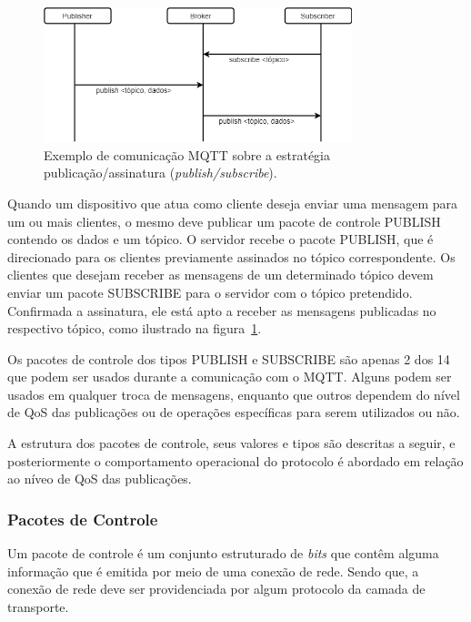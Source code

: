 \begin{figure}[ht]
	\centering
	\includegraphics[width=0.8\textwidth]{imagens/mqtt_broker.png}
	\caption{Exemplo de comunicação MQTT sobre a estratégia publicação/assinatura (\textit{publish/subscribe}).
		\label{fig:mqtt_broker}}
\end{figure}
\FloatBarrier

Quando um dispositivo que atua como cliente deseja enviar uma mensagem para um ou mais clientes, o mesmo deve publicar um pacote de controle PUBLISH contendo os dados e um tópico. O servidor recebe o pacote PUBLISH, que é direcionado para os clientes previamente assinados no tópico correspondente. Os clientes que desejam receber as mensagens de um determinado tópico devem enviar um pacote SUBSCRIBE para o servidor com o tópico pretendido. Confirmada a assinatura, ele está apto a receber as mensagens publicadas no respectivo tópico, como ilustrado na figura~\ref{fig:mqtt_broker}.

Os pacotes de controle dos tipos  PUBLISH e SUBSCRIBE são apenas 2 dos 14 que podem ser usados durante a comunicação com o MQTT. Alguns podem ser usados em qualquer troca de mensagens, enquanto que outros dependem do nível de QoS das publicações ou de operações específicas para serem utilizados ou não.

A estrutura dos pacotes de controle, seus valores e tipos são descritas a seguir, e posteriormente o comportamento operacional do protocolo é abordado em relação ao níveo de QoS das publicações.

\subsubsection*{Pacotes de Controle} \label{sec:mqtt_format}

Um pacote de controle é um conjunto estruturado de \textit{bits} que contêm alguma informação que é emitida por meio de uma conexão de rede. Sendo que, a conexão de rede deve ser  providenciada por algum protocolo da camada de transporte.

